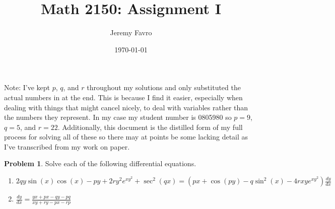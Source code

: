 \documentclass[10pt]{article}
\title{Math 2150: Assignment I}
\author{Jeremy Favro}
\date{\today}
\theoremstyle{definition}
\newtheorem{problem}{Problem}
\begin{document}
\maketitle
Note: I've kept $p$, $q$, and $r$ throughout my solutions and only substituted the actual numbers in at the end. This is because I find it easier,
especially when dealing with things that might cancel nicely, to deal with variables rather than the numbers they represent. In my case my 
student number is 0805980 so $p=9$, $q=5$, and $r=22$. Additionally, this document is the distilled form of my full process for solving all of these so there may at
points be some lacking detail as I've transcribed from my work on paper.
\\
\begin{problem}
Solve each of the following differential equations.
\begin{enumerate}[label=(\alph*)]
  \item $\displaystyle 2qy\sin(x)\cos(x)-py+2ry^2e^{xy^2}+\sec^2(qx)=\left(px+\cos(py)-q\sin^2(x)-4rxye^{xy^2}\right)\frac{dy}{dx}$
  \item $\displaystyle \frac{dy}{dx}=\frac{yx+px-qy-pq}{xy+ry-px-rp}$
\end{enumerate}
\begin{center}

\end{center}
\end{problem}
\end{document}
